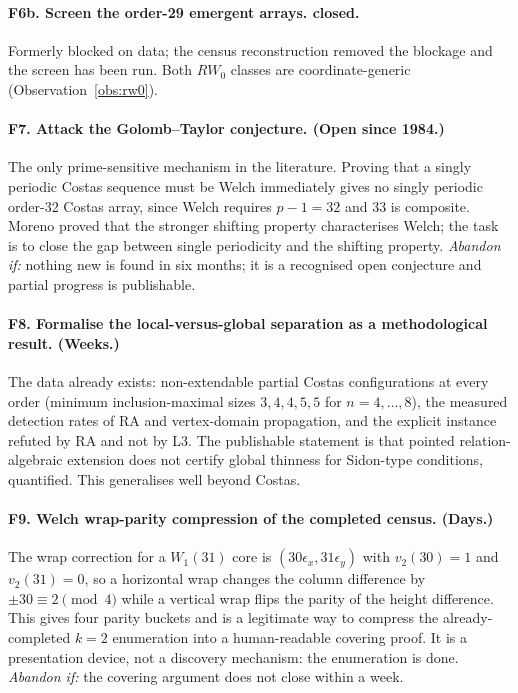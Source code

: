 \documentclass[11pt,a4paper]{article}
\theoremstyle{definition}
\newcommand{\vtwo}{v_2}
\begin{document}
\paragraph{F6b. Screen the order-29 emergent arrays. \textbf{closed}.}
Formerly blocked on data; the census reconstruction removed the blockage and the
screen has been run. Both $RW_0$ classes are coordinate-generic
(Observation~\ref{obs:rw0}).

\paragraph{F7. Attack the Golomb--Taylor conjecture. (Open since 1984.)}
The only prime-sensitive mechanism in the literature. Proving that a singly
periodic Costas sequence must be Welch immediately gives no singly periodic
order-32 Costas array, since Welch requires $p-1=32$ and 33 is composite. Moreno
proved that the stronger shifting property characterises Welch; the task is to
close the gap between single periodicity and the shifting property. \emph{Abandon
if:} nothing new is found in six months; it is a recognised open conjecture and
partial progress is publishable.

\paragraph{F8. Formalise the local-versus-global separation as a methodological
result. (Weeks.)}
The data already exists: non-extendable partial Costas configurations at every
order (minimum inclusion-maximal sizes $3,4,4,5,5$ for $n=4,\dots,8$), the
measured detection rates of RA and vertex-domain propagation, and the explicit
instance refuted by RA and not by L3. The publishable statement is that pointed
relation-algebraic extension does not certify global thinness for Sidon-type
conditions, quantified. This generalises well beyond Costas.

\paragraph{F9. Welch wrap-parity compression of the completed census.
(Days.)}
The wrap correction for a $W_1(31)$ core is $(30\epsilon_x, 31\epsilon_y)$ with
$\vtwo(30)=1$ and $\vtwo(31)=0$, so a horizontal wrap changes the column
difference by $\pm30\equiv2\pmod4$ while a vertical wrap flips the parity of the
height difference. This gives four parity buckets and is a legitimate way to
compress the already-completed $k=2$ enumeration into a human-readable covering
proof. It is a presentation device, not a discovery mechanism: the enumeration is
done. \emph{Abandon if:} the covering argument does not close within a week.
\end{document}

